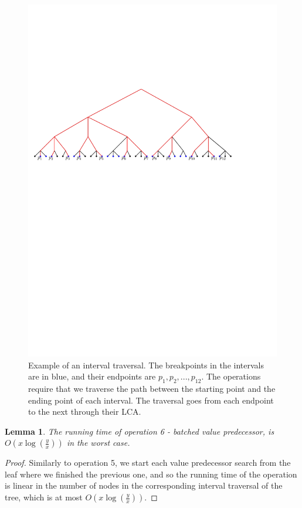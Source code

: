 \documentclass[11pt,a4paper]{article}
\newtheorem{lemma}{Lemma}
\theoremstyle{definition}
\theoremstyle{remark}
\begin{document}
\begin{figure}[h]
\begin{center}
\includegraphics{interval_traversal}
\end{center}
\caption{Example of an interval traversal. The breakpoints in the intervals are in blue, and their endpoints are $p_1,p_2,...,p_{12}$. The operations require that we traverse the path between the starting point and the ending point of each interval. The traversal goes from each endpoint to the next through their LCA.}
\end{figure}


\begin{lemma}
The running time of operation 6 - batched value predecessor, is $O(x \log (\frac{y}{x}))$ in the worst case.
\end{lemma}
\begin{proof}
Similarly to operation 5, we start each value predecessor search from the leaf where we finished the previous one, and so the running time of the operation is linear in the number of nodes in the corresponding interval traversal of the tree, which is at most $O(x \log (\frac{y}{x}))$.
\end{proof}
\end{document}
